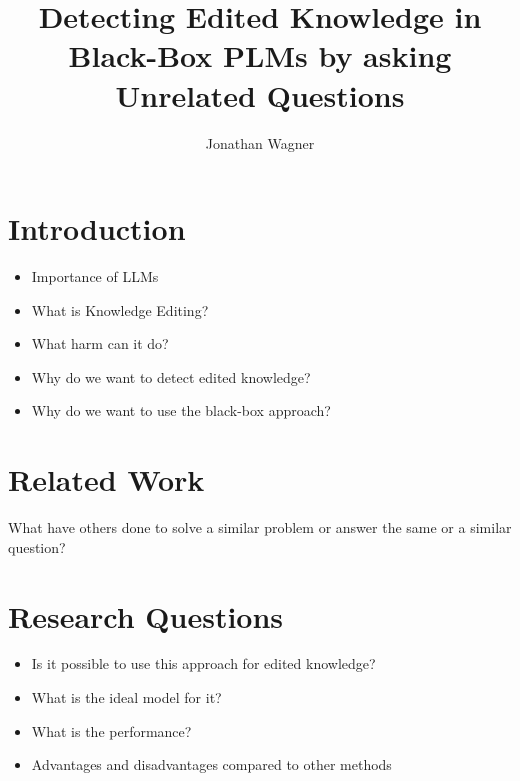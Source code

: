 \documentclass[sigplan, nonacm]{acmart}
\title{Detecting Edited Knowledge in Black-Box PLMs by asking Unrelated Questions}
\author{Jonathan Wagner}
\begin{document}
    \maketitle
    
    \section{Introduction}
   	\begin{itemize}
    		\item Importance of LLMs
    		\item What is Knowledge Editing? \cite{youssef_detecting_2024}
		\item What harm can it do?
    		\item Why do we want to detect edited knowledge?
    		\item Why do we want to use the black-box approach?
    	\end{itemize}
        
    \section{Related Work}
    	What have others done to solve a similar problem or answer the same or a similar question?    
    \section{Research Questions}
   	\begin{itemize}
		\item Is it possible to use this approach for edited knowledge?
		\item What is the ideal model for it?
		\item What is the performance?
		\item Advantages and disadvantages compared to other methods
	\end{itemize}
    
\end{document}
